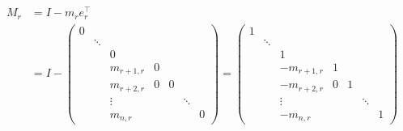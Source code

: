 \begin{remark}
    \begin{align*}
        M_r
         &
        = I - m_r e_r^\top
        \\
         &
        = I - \begin{pmatrix}
                  0 &        &           &   &   &        &   \\
                    & \ddots &           &   &   &        &   \\
                    &        & 0         &   &   &        &   \\
                    &        & m_{r+1,r} & 0 &   &        &   \\
                    &        & m_{r+2,r} & 0 & 0 &        &   \\
                    &        & \vdots    &   &   & \ddots &   \\
                    &        & m_{n,r}   &   &   &        & 0
              \end{pmatrix}
        = \begin{pmatrix}
              1 &        &            &   &   &        &   \\
                & \ddots &            &   &   &        &   \\
                &        & 1          &   &   &        &   \\
                &        & -m_{r+1,r} & 1 &   &        &   \\
                &        & -m_{r+2,r} & 0 & 1 &        &   \\
                &        & \vdots     &   &   & \ddots &   \\
                &        & -m_{n,r}   &   &   &        & 1
          \end{pmatrix}
    \end{align*}
\end{remark}

